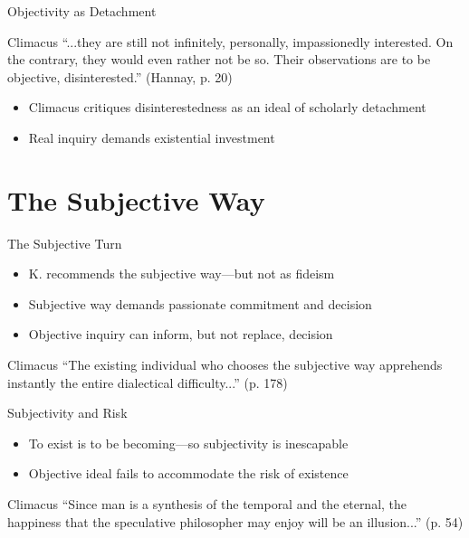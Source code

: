 \documentclass[12pt]{beamer}
\begin{document}
\begin{frame}{Objectivity as Detachment}
\begin{block}{Climacus}
“...they are still not infinitely, personally, impassionedly interested. On the contrary, they would even rather not be so. Their observations are to be objective, disinterested.” (Hannay, p. 20)
\end{block}
\begin{itemize}
  \item Climacus critiques disinterestedness as an ideal of scholarly detachment
  \item Real inquiry demands existential investment
\end{itemize}
\end{frame}

\section{The Subjective Way}

\begin{frame}{The Subjective Turn}
\begin{itemize}
  \item K. recommends the subjective way—but not as fideism
  \item Subjective way demands passionate commitment and decision
  \item Objective inquiry can inform, but not replace, decision
\end{itemize}
\begin{block}{Climacus}
“The existing individual who chooses the subjective way apprehends instantly the entire dialectical difficulty...” (p. 178)
\end{block}
\end{frame}

\begin{frame}{Subjectivity and Risk}
\begin{itemize}
  \item To exist is to be becoming—so subjectivity is inescapable
  \item Objective ideal fails to accommodate the risk of existence
\end{itemize}
\begin{block}{Climacus}
“Since man is a synthesis of the temporal and the eternal, the happiness that the speculative philosopher may enjoy will be an illusion...” (p. 54)
\end{block}
\end{frame}
\end{document}
